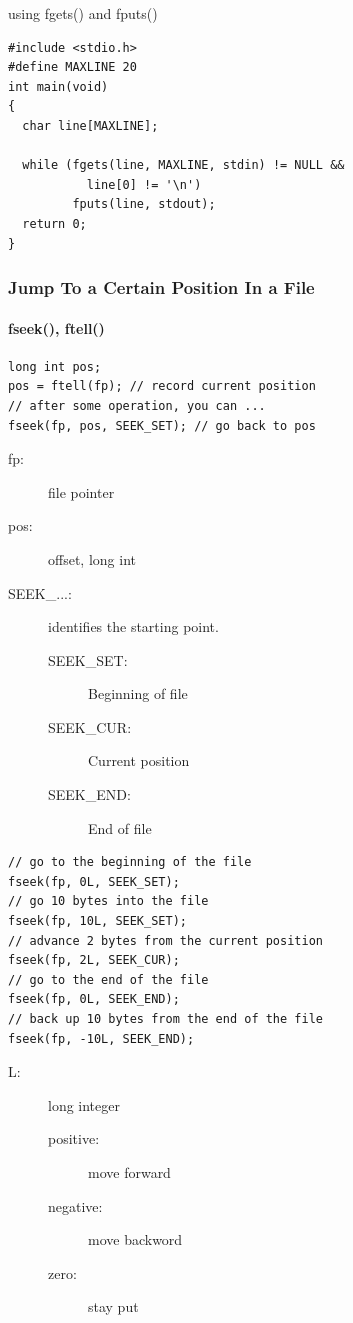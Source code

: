 \documentclass[hyperref={xetex,colorlinks,linkcolor=blue},green,compress]{beamer}
\begin{document}
\begin{frame}[fragile]
  \begin{exampleblock}{using fgets() and fputs()}
    \begin{lstlisting}
#include <stdio.h>
#define MAXLINE 20
int main(void)
{
  char line[MAXLINE];

  while (fgets(line, MAXLINE, stdin) != NULL &&
           line[0] != '\n')
         fputs(line, stdout);
  return 0;
}
    \end{lstlisting}
  \end{exampleblock}
\end{frame}

\begin{frame}[fragile]
  \frametitle{Jump To a Certain Position In a
    File}\framesubtitle{fseek(), ftell()}
  \begin{exampleblock}{}
    \begin{lstlisting}
long int pos;
pos = ftell(fp); // record current position
// after some operation, you can ...
fseek(fp, pos, SEEK_SET); // go back to pos
    \end{lstlisting}
  \end{exampleblock}
  \begin{description}
  \item[fp:] file pointer
  \item[pos:] offset, \alert{long} int
  \item[SEEK\_...:] identifies the starting point.
    \begin{description}
    \item[SEEK\_SET:] Beginning of file
    \item[SEEK\_CUR:] Current position
    \item[SEEK\_END:] End of file
    \end{description}
  \end{description}
\end{frame}

\begin{frame}[fragile]
 \begin{example}
    \begin{lstlisting}
// go to the beginning of the file
fseek(fp, 0L, SEEK_SET);   
// go 10 bytes into the file
fseek(fp, 10L, SEEK_SET);  
// advance 2 bytes from the current position
fseek(fp, 2L, SEEK_CUR);   
// go to the end of the file
fseek(fp, 0L, SEEK_END);   
// back up 10 bytes from the end of the file
fseek(fp, -10L, SEEK_END); 
    \end{lstlisting}
  \end{example}
  \begin{description}
  \item[L:] long integer
    \begin{description}
    \item[positive:] move forward
    \item[negative:] move backword
    \item[zero:] stay put
    \end{description}
  \end{description}
\end{frame}
\end{document}
